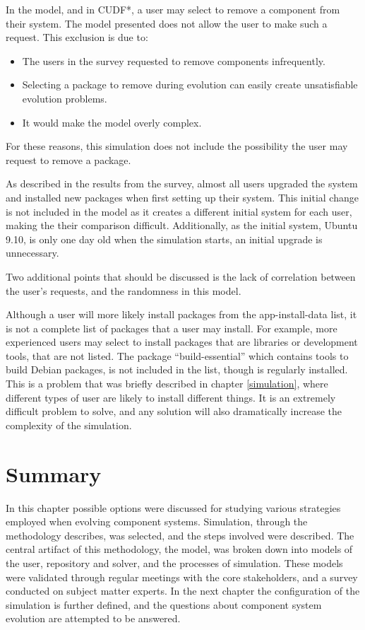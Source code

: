 In the \modelname model, and in CUDF*, a user may select to remove a component from their system.
The \usermodel model presented does not allow the user to make such a request.
This exclusion is due to:
\begin{itemize}
  \item The users in the survey requested to remove components infrequently.
  \item Selecting a package to remove during evolution can easily create unsatisfiable evolution problems.
  \item It would make the \usermodel model overly complex. 
\end{itemize}
For these reasons, this simulation does not include the possibility the user may request to remove a package.

As described in the results from the survey, almost all users upgraded the system and installed new packages when first setting up their system.
This initial change is not included in the \usermodel model as it creates a different initial system for each user,
making the their comparison difficult.
Additionally, as the initial system, Ubuntu 9.10, is only one day old when the simulation starts, an initial upgrade is unnecessary.

Two additional points that should be discussed is the lack of correlation between the user's requests,
and the randomness in this model.



Although a user will more likely install packages from the app-install-data list, it is not a complete list of packages that a user may install. 
For example, more experienced users may select to install packages that are libraries or development tools, that are not listed.
The package ``build-essential'' which contains tools to build Debian packages, is not included in the list, though is regularly installed.
This is a problem that was briefly described in chapter \ref{simulation}, where different types of user are likely to install different things.
It is an extremely difficult problem to solve, and any solution will also dramatically increase the complexity of the simulation.

\section{Summary}
{}In this chapter possible options were discussed for studying various strategies employed when evolving component systems.
{}Simulation, through the methodology \citep{Law2005} describes, was selected, and the steps involved were described.
{}The central artifact of this methodology, the \usermodel model, was broken down into models of the user, repository and solver, and the processes of simulation.
{}These models were validated through regular meetings with the core stakeholders, and a survey conducted on subject matter experts.
{}In the next chapter the configuration of the simulation is further defined, and the questions about component system evolution are attempted to be answered.
